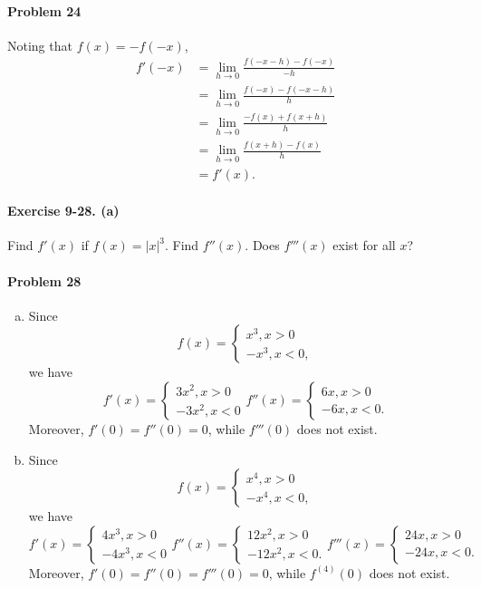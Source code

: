\documentclass{article}
\begin{document}
\paragraph{Problem 24} Noting that $f(x) = -f(-x)$,
\begin{align*}
  f'(-x) &= \lim_{h \to 0}\frac{f(-x - h) - f(-x)}{-h} \\
         &= \lim_{h \to 0}\frac{f(-x) - f(-x - h)}{h} \\
         &= \lim_{h \to 0}\frac{-f(x) + f(x + h)}{h} \\
         &= \lim_{h \to 0}\frac{f(x + h) - f(x)}{h} \\
         &= f'(x).
\end{align*}

\paragraph{Exercise 9-28. (a)} Find $f'(x)$ if $f(x) = |x|^3$. Find $f''(x)$.
Does $f'''(x)$ exist for all $x$?

\paragraph{Problem 28}
\begin{enumerate}[(a)]
  \item Since \[
      f(x) =
      \begin{cases}
        x^3, x > 0 \\
        -x^3, x < 0,
      \end{cases}
    \] we have \[
      f'(x) =
      \begin{cases}
        3x^2, x > 0 \\
        -3x^2, x < 0
      \end{cases}
      f''(x) =
      \begin{cases}
        6x, x > 0 \\
        -6x, x < 0.
      \end{cases}
    \] Moreover, $f'(0) = f''(0) = 0$, while $f'''(0)$ does not exist.
  \item Since \[
      f(x) =
      \begin{cases}
        x^4, x > 0 \\
        -x^4, x < 0,
      \end{cases}
      \] we have \[
      f'(x) =
      \begin{cases}
        4x^3, x > 0 \\
        -4x^3, x < 0
      \end{cases}
      f''(x) =
      \begin{cases}
        12x^2, x > 0 \\
        -12x^2, x < 0.
      \end{cases}
      f'''(x) =
      \begin{cases}
        24x, x > 0 \\
        -24x, x < 0.
      \end{cases}
    \] Moreover, $f'(0) = f''(0) = f'''(0) = 0$, while $f^{(4)}(0)$ does not
    exist.
\end{enumerate}
\end{document}
